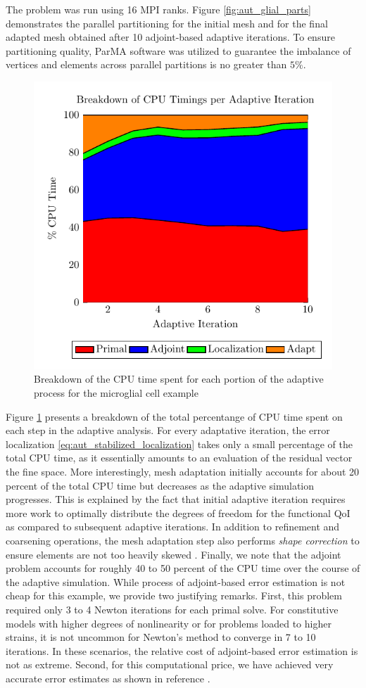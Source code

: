 The problem was run using 16 MPI ranks. Figure \ref{fig:aut_glial_parts}
demonstrates the parallel partitioning for the initial mesh and for
the final adapted mesh obtained after 10 adjoint-based adaptive
iterations. To ensure partitioning quality, ParMA software was
utilized to guarantee the imbalance of vertices and elements
across parallel partitions is no greater than $5\%$.

\begin{figure}[ht!]
\centering
\includegraphics[width=0.4\linewidth]{img/aut_glial_timings.pdf}
\caption{Breakdown of the CPU time spent for each portion of
the adaptive process for the microglial cell example}
\label{fig:aut_glial_timings}
\end{figure}

Figure \ref{fig:aut_glial_timings} presents a breakdown of the
total percentange of CPU time spent on each step in the
adaptive analysis. For every adaptative iteration, the error
localization \eqref{eq:aut_stabilized_localization} takes only
a small percentage of the total CPU time, as it essentially amounts
to an evaluation of the residual vector the fine space. More
interestingly, mesh adaptation initially accounts for about
20 percent of the total CPU time but decreases as the adaptive
simulation progresses. This is explained by the fact that initial
adaptive iteration requires more work to optimally distribute
the degrees of freedom for the functional QoI as compared to
subsequent adaptive iterations. In addition to refinement
and coarsening operations, the mesh adaptation step also
performs \emph{shape correction} to ensure elements are not
too heavily skewed \cite{li20053d}. Finally, we note that the
adjoint problem accounts for roughly 40 to 50 percent of the CPU time
over the course of the adaptive simulation. While process of
adjoint-based error estimation is not cheap for this example,
we provide two justifying remarks. First, this problem required only
3 to 4 Newton iterations for each primal solve. For constitutive
models with higher degrees of nonlinearity or for problems loaded to
higher strains, it is not uncommon for Newton's method to converge
in 7 to 10 iterations. In these scenarios, the relative cost of
adjoint-based error estimation is not as extreme.
Second, for this computational price, we have
achieved very accurate error estimates as shown in
reference \cite{granzow2017adjoint}.

